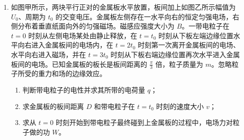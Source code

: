 \documentclass[\gkver]{gaokaozhenti}
\begin{document}
\begin{enumerate}
{$I_{F}=\frac{1}{2}\times0.1\times6600 \UNs=330 \UNs$

方向竖直向上；

②头锤落到气囊上时的速度

$v_{0}=\sqrt{2gH}=8 \Ums$

与气囊作用过程由动量定理（向上为正方向）

$I_{F}-mgt=mv-(-mv_{0})$

解得 $v=2 \Ums$

则上升的最大高度

$h=\frac{v^{2}}{2g}=0.2 \Um$。
}

\item
如图甲所示，两块平行正对的金属板水平放置，板间加上如图乙所示幅值为 $U_{0}$、周期为 $t_{0}$ 的交变电压。金属板左侧存在一水平向右的恒定匀强电场，右侧分布着垂直纸面向外的匀强磁场。磁感应强度大小为 $B$。一带电粒子在 $t = 0$ 时刻从左侧电场某处由静止释放，在 $t = t_{0}$ 时刻从下板左端边缘位置水平向右进入金属板间的电场内，在 $t = 2t_{0}$ 时刻第一次离开金属板间的电场、水平向右进入磁场，并在 $t = 3t_{0}$ 时刻从下板右端边缘位置再次水平进入金属板间的电场。已知金属板的板长是板间距离的 $\frac{\pi}{3}$ 倍，粒子质量为 $m$。忽略粒子所受的重力和场的边缘效应。
\begin{enumerate}
	\item
	判断带电粒子的电性并求其所带的电荷量 $q$；
	\item
	求金属板的板间距离 $D$ 和带电粒子在 $t = t_{0}$ 时刻的速度大小 $v$；
	\item
	求从 $t = 0$ 时刻开始到带电粒子最终碰到上金属板的过程中，电场力对粒子做的功 $W$。
\end{enumerate}
\end{enumerate}
\end{document}
